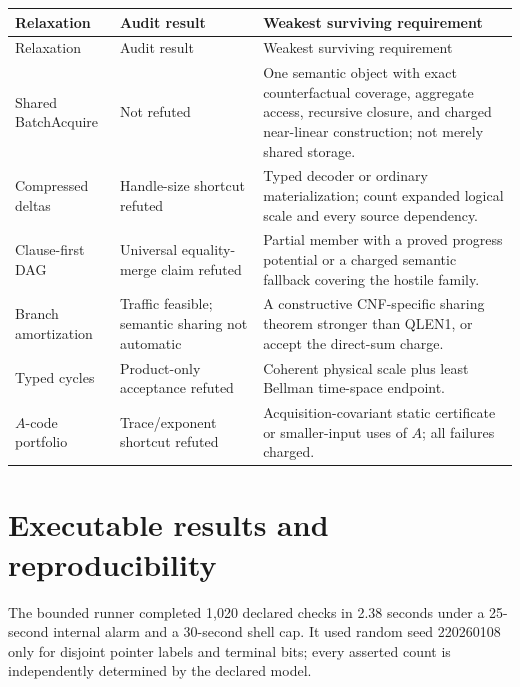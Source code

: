 \documentclass[11pt]{article}
\begin{document}
\begin{longtable}{L{0.18\textwidth}L{0.19\textwidth}L{0.55\textwidth}}
\toprule
Relaxation & Audit result & Weakest surviving requirement\\
\midrule
\endfirsthead
\toprule
Relaxation & Audit result & Weakest surviving requirement\\
\midrule
\endhead
\bottomrule
\endfoot
Shared BatchAcquire & Not refuted & One semantic object with exact
counterfactual coverage, aggregate access, recursive closure, and charged
near-linear construction; not merely shared storage.\\
Compressed deltas & Handle-size shortcut refuted & Typed decoder or ordinary
materialization; count expanded logical scale and every source dependency.\\
Clause-first DAG & Universal equality-merge claim refuted & Partial member
with a proved progress potential or a charged semantic fallback covering the
hostile family.\\
Branch amortization & Traffic feasible; semantic sharing not automatic & A
constructive CNF-specific sharing theorem stronger than QLEN1, or accept the
direct-sum charge.\\
Typed cycles & Product-only acceptance refuted & Coherent physical scale plus
least Bellman time-space endpoint.\\
$A$-code portfolio & Trace/exponent shortcut refuted & Acquisition-covariant
static certificate or smaller-input uses of $A$; all failures charged.\\
\end{longtable}

\section{Executable results and reproducibility}

The bounded runner completed 1,020 declared checks in 2.38 seconds under a
25-second internal alarm and a 30-second shell cap.  It used random seed
220260108 only for disjoint pointer labels and terminal bits; every asserted
count is independently determined by the declared model.
\end{document}
